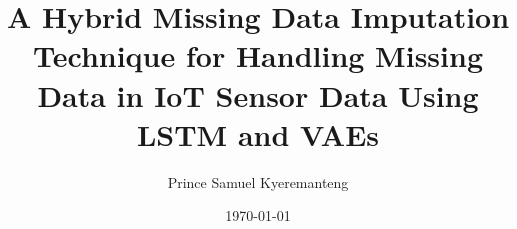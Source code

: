 \documentclass[12pt]{report}
\begin{document}
\doublespacing

\title{\textbf{A Hybrid Missing Data Imputation Technique for Handling Missing Data in IoT Sensor Data Using LSTM and VAEs}}
\author{Prince Samuel Kyeremanteng}
\date{\today}
\maketitle

\tableofcontents
\clearpage








%
%
%



\end{document}
